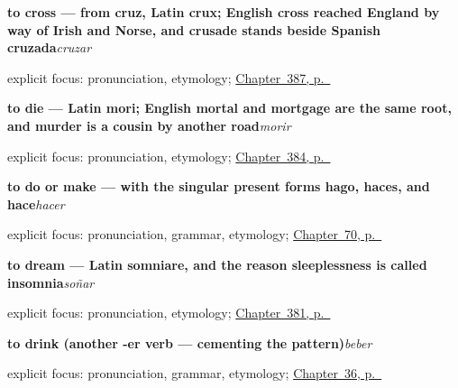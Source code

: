 \noindent\begin{minipage}[t]{\linewidth}
\raggedright
\textbf{to cross — from cruz, Latin crux; English cross reached England by way of Irish and Norse, and crusade stands beside Spanish cruzada}\enspace\emph{cruzar}\par
\footnotesize explicit focus: pronunciation, etymology; \hyperref[ch:quemar-y-cruzar]{Chapter~387, p.~\pageref*{ch:quemar-y-cruzar}}
\end{minipage}\par\smallskip

\noindent\begin{minipage}[t]{\linewidth}
\raggedright
\textbf{to die — Latin mori; English mortal and mortgage are the same root, and murder is a cousin by another road}\enspace\emph{morir}\par
\footnotesize explicit focus: pronunciation, etymology; \hyperref[ch:enviar-y-subir]{Chapter~384, p.~\pageref*{ch:enviar-y-subir}}
\end{minipage}\par\smallskip

\noindent\begin{minipage}[t]{\linewidth}
\raggedright
\textbf{to do or make — with the singular present forms hago, haces, and hace}\enspace\emph{hacer}\par
\footnotesize explicit focus: pronunciation, grammar, etymology; \hyperref[ch:yo-go-verbs]{Chapter~70, p.~\pageref*{ch:yo-go-verbs}}
\end{minipage}\par\smallskip

\noindent\begin{minipage}[t]{\linewidth}
\raggedright
\textbf{to dream — Latin somniare, and the reason sleeplessness is called insomnia}\enspace\emph{soñar}\par
\footnotesize explicit focus: pronunciation, etymology; \hyperref[ch:lavar-y-romper]{Chapter~381, p.~\pageref*{ch:lavar-y-romper}}
\end{minipage}\par\smallskip

\noindent\begin{minipage}[t]{\linewidth}
\raggedright
\textbf{to drink (another -er verb — cementing the pattern)}\enspace\emph{beber}\par
\footnotesize explicit focus: pronunciation, grammar, etymology; \hyperref[ch:spanish-beber-preguntas]{Chapter~36, p.~\pageref*{ch:spanish-beber-preguntas}}
\end{minipage}\par\smallskip

